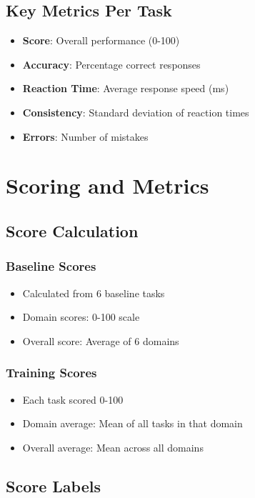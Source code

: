 \documentclass[12pt,a4paper]{article}
\begin{document}
\subsection{Key Metrics Per Task}

\begin{itemize}
    \item \textbf{Score}: Overall performance (0-100)
    \item \textbf{Accuracy}: Percentage correct responses
    \item \textbf{Reaction Time}: Average response speed (ms)
    \item \textbf{Consistency}: Standard deviation of reaction times
    \item \textbf{Errors}: Number of mistakes
\end{itemize}

\section{Scoring and Metrics}

\subsection{Score Calculation}

\subsubsection{Baseline Scores}
\begin{itemize}
    \item Calculated from 6 baseline tasks
    \item Domain scores: 0-100 scale
    \item Overall score: Average of 6 domains
\end{itemize}

\subsubsection{Training Scores}
\begin{itemize}
    \item Each task scored 0-100
    \item Domain average: Mean of all tasks in that domain
    \item Overall average: Mean across all domains
\end{itemize}

\subsection{Score Labels}
\end{document}
